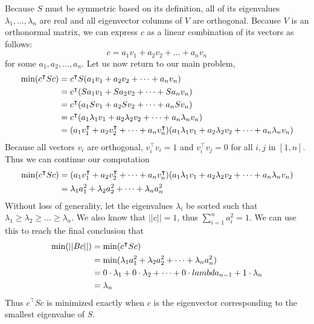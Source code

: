 \documentclass{article}%
\begin{document}
Because $S$ must be symmetric based on its definition, all of its eigenvalues $\lambda_1, \dots , \lambda_n$ are real and all eigenvector columns of $V$ are orthogonal. Because $V$ is an orthonormal matrix, we can express $c$ as a linear combination of its vectors as follows:
\[
c=a_1 v_1 + a_2 v_2 + \dots + a_n v_n
\]
for some $a_1, a_2, \dots, a_n$. Let us now return to our main problem,
\begin{align*}
    \textnormal{min} (c^\intercal S c )&=c^\intercal S (a_1 v_1 + a_2 v_2 + \dots + a_n v_n)\\
    &=c^\intercal (Sa_1 v_1 + Sa_2 v_2 + \dots + Sa_n v_n)\\
    &=c^\intercal (a_1 S v_1 + a_2 S v_2 + \dots + a_n S v_n)\\
    &=c^\intercal (a_1 \lambda_1 v_1 + a_2 \lambda_2 v_2 + \dots + a_n \lambda_n v_n)\\
    &= (a_1 v_1^\intercal + a_2 v_2^\intercal + \dots + a_n v_n^\intercal)(a_1 \lambda_1 v_1 + a_2 \lambda_2 v_2 + \dots + a_n \lambda_n v_n)
\end{align*}
Because all vectors $v_i$ are orthogonal, $v_i ^\intercal v_i =1$ and $v_i^\intercal v_j = 0$ for all $i,j$ in $[1,n]$. Thus we can continue our computation
\begin{align*}
    \textnormal{min} (c^\intercal S c )&=(a_1 v_1^\intercal + a_2 v_2^\intercal + \dots + a_n v_n^\intercal)(a_1 \lambda_1 v_1 + a_2 \lambda_2 v_2 + \dots + a_n \lambda_n v_n)\\
    &= \lambda_1 a_1^2 + \lambda_2 a_2^2 + \dots + \lambda_n a_n^2
\end{align*}
Without loss of generality, let the eigenvalues $\lambda_i$ be sorted such that $\lambda_1 \geq \lambda_2 \geq \dots \geq \lambda_n$. We also know that $||c||=1$, thus $\sum_{i=1}^n a_i^2 =1$. We can use this to reach the final conclusion that
\begin{align*}
\textnormal{min}(||Bc||)&=\textnormal{min}(c^\intercal S c) \\&= \textnormal{min}(\lambda_1 a_1^2 + \lambda_2 a_2^2 + \dots + \lambda_n a_n^2)\\ &= 0 \cdot \lambda_1 + 0 \cdot \lambda_2 + \dots + 0 \cdot lambda_{n-1} + 1 \cdot \lambda_n\\
&= \lambda_n
\end{align*}
Thus $c^\intercal S c$ is minimized exactly when $c$ is the eigenvector corresponding to the smallest eigenvalue of $S$.
\end{document}
